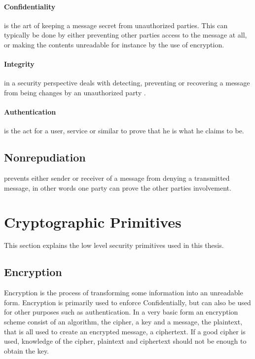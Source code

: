 \documentclass[english,12pt,a4paper]{book}
\begin{document}
\paragraph{Confidentiality} is the art of keeping a message secret from
unauthorized parties\cite[p. 18]{stallings}. This can typically be done by
either preventing other parties access to the message at all, or making the
contents unreadable for instance by the use of encryption. 

\paragraph{Integrity} in a security perspective deals with detecting,
preventing or recovering a message from being changes by an unauthorized party
\cite{stallings}.

\paragraph{Authentication} is the act for a user, service or similar to prove
that he is what he claims to be\cite{stallings}. 

\subsection{Nonrepudiation} prevents either sender or receiver of a message
from denying a transmitted message, in other words one party can prove the
other parties involvement\cite{stallings}.

\section{Cryptographic Primitives}
This section explains the low level security primitives used in this thesis.

\subsection{Encryption}
Encryption is the process of transforming some information into an unreadable
form. Encryption is primarily used to enforce Confidentially, but can also be
used for other purposes such as authentication. In a very basic form an
encryption scheme consist of an algorithm, the cipher, a key and a message, the
plaintext, that is all used to create an encrypted message, a ciphertext. If
a good cipher is used, knowledge of the cipher, plaintext and ciphertext should
not be enough to obtain the key.
\end{document}
